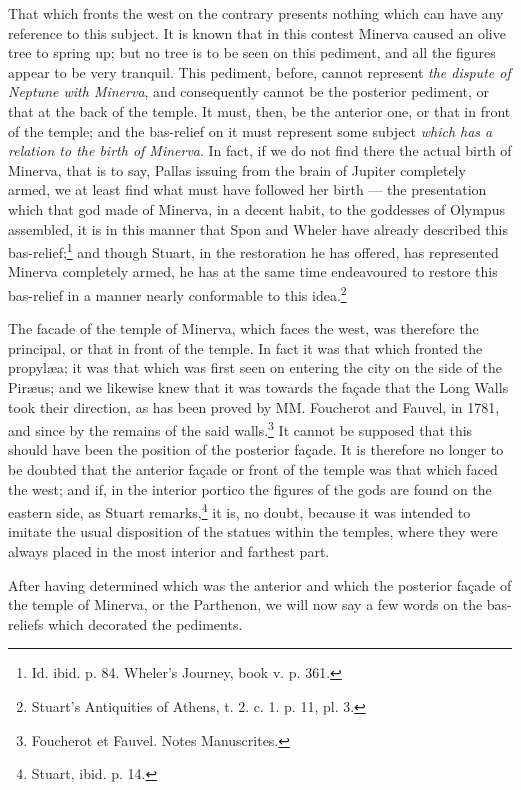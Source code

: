 \documentclass[a4paper, 11pt, oneside, polutonikogreek, english]{article}
\begin{document}
That which fronts the west on the contrary presents nothing which can have any reference to this subject. It is known that in this contest Minerva caused an olive tree to spring up; but no tree is to be seen on this pediment, and all the figures appear to be very tranquil. This pediment, before, cannot represent \emph{the dispute of Neptune with Minerva}, and consequently cannot be the posterior pediment, or that at the back of the temple. It must, then, be the anterior one, or that in front of the temple; and the bas-relief on it must represent some subject \emph{which has a relation to the birth of Minerva}. In fact, if we do not find there the actual birth of Minerva, that is to say, Pallas issuing from the brain of Jupiter completely armed, we at least find what must have followed her birth --- the presentation which that god made of Minerva, in a decent habit, to the goddesses of Olympus assembled, it is in this manner that Spon and Wheler have already described this bas-relief;\footnote{Id. ibid. p. 84. Wheler's Journey, book v. p. 361.} and though Stuart, in the restoration he has offered, has represented Minerva completely armed, he has at the same time endeavoured to restore this bas-relief in a manner nearly conformable to this idea.\footnote{Stuart's Antiquities of Athens, t. 2. c. 1. p. 11, pl. 3.}

The facade of the temple of Minerva, which faces the west, was therefore the principal, or that in front of the temple. In fact it was that which fronted the propylæa; it was that which was first seen on entering the city on the side of the Piræus; and we likewise knew that it was towards the façade that the Long Walls took their direction, as has been proved by MM. Foucherot and Fauvel, in 1781, and since by the remains of the said walls.\footnote{Foucherot et Fauvel. Notes Manuscrites.} It cannot be supposed that this should have been the position of the posterior façade. It is therefore no longer to be doubted that the anterior façade or front of the temple was that which faced the west; and if, in the interior portico the figures of the gods are found on the eastern side, as Stuart remarks,\footnote{Stuart, ibid. p. 14.} it is, no doubt, because it was intended to imitate the usual disposition of the statues within the temples, where they were always placed in the most interior and farthest part.

After having determined which was the anterior and which the posterior façade of the temple of Minerva, or the Parthenon, we will now say a few words on the bas-reliefs which decorated the pediments.
\end{document}
